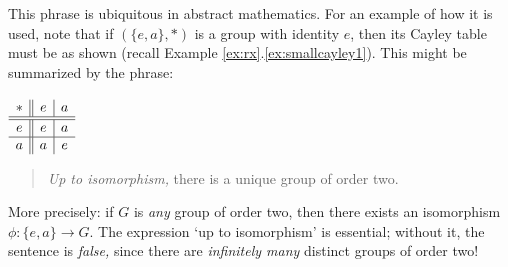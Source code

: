\label{sec:uptoiso}

\begin{minipage}[t]{0.85\linewidth}\vspace{-10pt}
This phrase is ubiquitous in abstract mathematics. For an example of how it is used, note that if $(\{e,a\},*)$ is a group with identity $e$, then its Cayley table must be as shown (recall Example \ref*{ex:rx}.\ref{ex:smallcayley1}). This might be summarized by the phrase:
\end{minipage}\begin{minipage}[t]{0.14\linewidth}\vspace{-10pt}
\flushright $\begin{array}[t]{c||c|c}
			* & e & a\\\hline\hline
			e & e & a\\\hline
			a & a & e
		\end{array}$
\end{minipage}\par

\begin{quote}
\emph{Up to isomorphism,} there is a unique group of order two.
\end{quote}

More precisely: if $G$ is \emph{any} group of order two, then there exists an isomorphism $\phi:\{e,a\}\to G$. The expression `up to isomorphism' is essential; without it, the sentence is \emph{false,} since there are \emph{infinitely many} distinct groups of order two!

\goodbreak



\vfil

